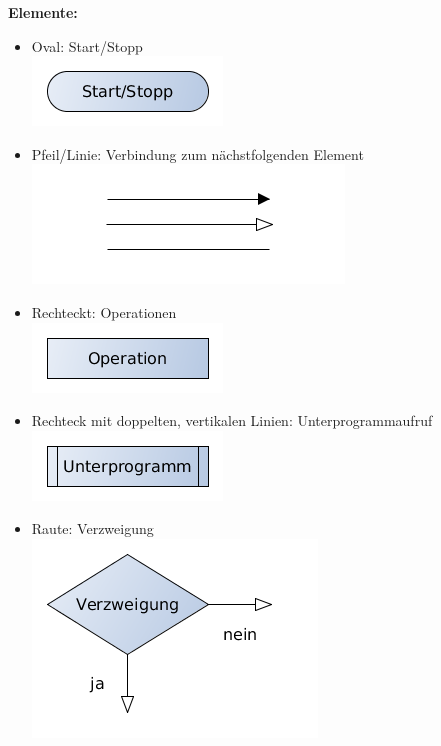 {\bf Elemente:}\\
\begin{itemize}
	\item Oval: Start/Stopp\\
		\includegraphics[scale=0.5]{pictures/lf06prog-pic/lf06prog-pap-start-stopp.png}
	\item Pfeil/Linie: Verbindung zum nächstfolgenden Element\\
		\includegraphics[scale=0.5]{pictures/lf06prog-pic/lf06prog-pap-pfeil.png}
	\item Rechteckt: Operationen\\
		\includegraphics[scale=0.5]{pictures/lf06prog-pic/lf06prog-pap-operation.png}	
	\item Rechteck mit doppelten, vertikalen Linien: Unterprogrammaufruf\\
		\includegraphics[scale=0.5]{pictures/lf06prog-pic/lf06prog-pap-unterprogramm.png}	
	\item Raute: Verzweigung\\
		\includegraphics[scale=0.5]{pictures/lf06prog-pic/lf06prog-pap-verzweigung.png}	

\end{itemize}
